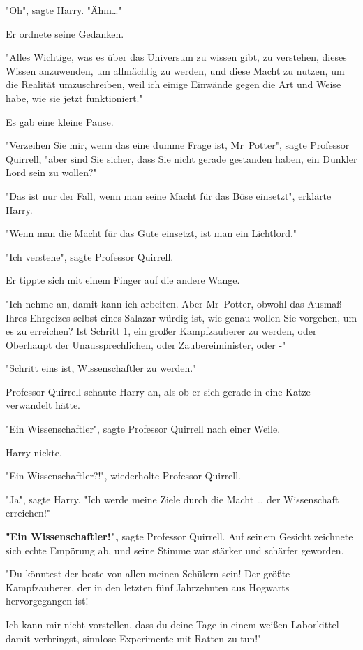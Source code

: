 {"Oh", sagte Harry. "Ähm…"

Er ordnete seine Gedanken.

"Alles Wichtige, was es über das Universum zu wissen gibt, zu verstehen, dieses Wissen anzuwenden, um allmächtig zu werden, und diese Macht zu nutzen, um die Realität umzuschreiben, weil ich einige Einwände gegen die Art und Weise habe, wie sie jetzt funktioniert."

Es gab eine kleine Pause.

"Verzeihen Sie mir, wenn das eine dumme Frage ist, Mr~Potter", sagte Professor Quirrell, "aber sind Sie sicher, dass Sie nicht gerade gestanden haben, ein Dunkler Lord sein zu wollen?"

"Das ist nur der Fall, wenn man seine Macht für das Böse einsetzt", erklärte Harry.

"Wenn man die Macht für das Gute einsetzt, ist man ein Lichtlord."

"Ich verstehe", sagte Professor Quirrell.

Er tippte sich mit einem Finger auf die andere Wange.

"Ich nehme an, damit kann ich arbeiten. Aber Mr~Potter, obwohl das Ausmaß Ihres Ehrgeizes selbst eines Salazar würdig ist, wie genau wollen Sie vorgehen, um es zu erreichen? Ist Schritt 1, ein großer Kampfzauberer zu werden, oder Oberhaupt der Unaussprechlichen, oder Zaubereiminister, oder -"

"Schritt eins ist, Wissenschaftler zu werden."

Professor Quirrell schaute Harry an, als ob er sich gerade in eine Katze verwandelt hätte.

"Ein Wissenschaftler", sagte Professor Quirrell nach einer Weile.

Harry nickte.

"Ein Wissenschaftler?!", wiederholte Professor Quirrell.

"Ja", sagte Harry. "Ich werde meine Ziele durch die Macht … der Wissenschaft erreichen!"

\textbf{"Ein Wissenschaftler!",} sagte Professor Quirrell. Auf seinem Gesicht zeichnete sich echte Empörung ab, und seine Stimme war stärker und schärfer geworden.

"Du könntest der beste von allen meinen Schülern sein! Der größte Kampfzauberer, der in den letzten fünf Jahrzehnten aus Hogwarts hervorgegangen ist!

Ich kann mir nicht vorstellen, dass du deine Tage in einem weißen Laborkittel damit verbringst, sinnlose Experimente mit Ratten zu tun!"

}

